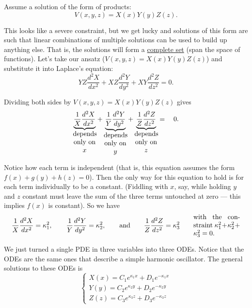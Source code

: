 \documentclass{article}
\numberwithin{equation}{section}
\begin{document}
Assume a solution of the form of products:
\begin{equation*}
    V(x, y, z) = X(x) Y(y) Z(z).
\end{equation*}

This looks like a severe constraint, but we get lucky and solutions of this form are such that linear combinations of multiple solutions can be used to build up anything else. That is, the solutions will form a \underline{complete set} (span the space of functions). Let's take our ansatz ($V(x, y, z) = X(x) Y(y) Z(z)$) and substitute it into Laplace's equation:
\begin{equation*}
    YZ \frac{d^2 X}{dx^2} + XZ \frac{d^2 Y}{dy^2} + XY \frac{d^2 Z}{dz^2} = 0.
\end{equation*}

Dividing both sides by $V(x,y,z) = X(x) Y(y) Z(z)$ gives
\begin{equation*}
    \underbrace{\frac{1}{X} \frac{d^2 X}{dx^2}}_{\parbox[c]{0.1\textwidth}{\centering depends only on $x$}} + \underbrace{\frac{1}{Y} \frac{d^2 Y}{dy^2}}_{\parbox[c]{0.1\textwidth}{\centering depends only on $y$}} + \underbrace{\frac{1}{Z} \frac{d^2 Z}{dz^2}}_{\parbox[c]{0.1\textwidth}{\centering depends only on $z$}} = \quad 0.
\end{equation*}

Notice how each term is independent (that is, this equation assumes the form $f(x) + g(y) + h(z) = 0$). Then the only way for this equation to hold is for each term individually to be a constant. (Fiddling with $x$, say, while holding $y$ and $z$ constant must leave the sum of the three terms untouched at zero --- this implies $f(x)$ is constant). So we have
\begin{equation*}
    \frac{1}{X} \frac{d^2 X}{dx^2} = \kappa_1^2, \qquad \frac{1}{Y} \frac{d^2 Y}{dy^2} = \kappa_2^2, \qquad \text{and} \qquad \frac{1}{Z} \frac{d^2 Z}{dz^2} = \kappa_3^2 \qquad \parbox[c]{0.2\textwidth}{with the constraint $\kappa_1^2 + \kappa_2^2 + \kappa_3^2 = 0$.}
\end{equation*}

We just turned a single PDE in three variables into three ODEs. Notice that the ODEs are the same ones that describe a simple harmonic oscillator. The general solutions to these ODEs is
\begin{equation*}
    \begin{cases} \displaystyle X(x) = C_1 e^{\kappa_1 x} + D_1 e^{-\kappa_1 x} \\[0.4cm] \displaystyle Y(y) = C_2 e^{\kappa_2 y} + D_2 e^{-\kappa_2 y} \\[0.4cm] \displaystyle Z(z) = C_3 e^{\kappa_3 z} + D_3 e^{-\kappa_3 z} \end{cases}
\end{equation*}
\end{document}
